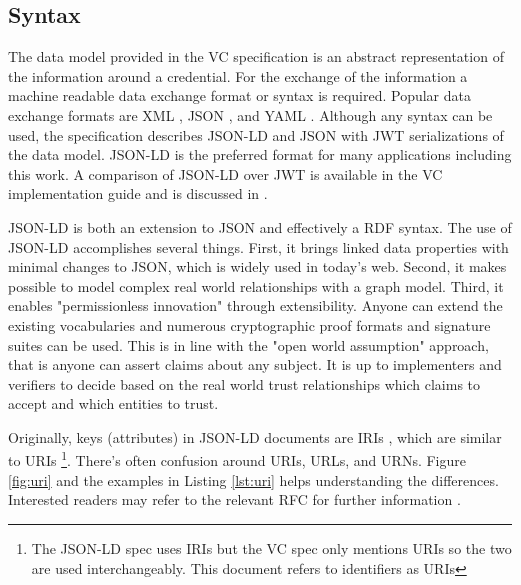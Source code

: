 \subsection{Syntax}

The data model provided in the \acrshort{VC} specification is an abstract representation of the information around a credential. For the exchange of the information a machine readable data exchange format or syntax is required. Popular data exchange formats are XML \parencite{xmlRFC}, \acrshort{JSON} \parencite{jsonRFC}, and \acrshort{YAML} \parencite{yaml}. Although any syntax can be used, the specification describes \acrfull{JSON-LD} \parencite{jsonld} and \acrshort{JSON} with \acrshort{JWT} \parencite{rfc7519} serializations of the data model. \acrshort{JSON-LD} is the preferred format for many applications including this work. A comparison of \acrshort{JSON-LD} over \acrshort{JWT} is available in the \acrshort{VC} implementation guide and is discussed in \cite{young_2021}. 

\acrshort{JSON-LD} is both an extension to \acrshort{JSON} and effectively a \acrfull{RDF} \parencite{rdf} syntax. The use of \acrshort{JSON-LD} accomplishes several things. First, it  brings linked data properties with minimal changes to \acrshort{JSON}, which is widely used in today's web. Second, it makes possible to model complex real world relationships with a graph model. Third, it enables "permissionless innovation" through extensibility. Anyone can extend the existing vocabularies and numerous cryptographic proof formats and signature suites can be used. This is in line with the "open world assumption" approach, that is anyone can assert claims about any subject. It is up to implementers and verifiers to decide based on the real world trust relationships which claims to accept and which entities to trust. 

Originally, keys (attributes) in \acrshort{JSON-LD} documents are \acrfull{IRI}s \parencite{rfc3987}, which are similar to \acrfull{URI}s \parencite{rfc3986}
\footnote{The \acrshort{JSON-LD} spec uses \acrshort{IRI}s but the \acrshort{VC} spec only mentions \acrshort{URI}s so the two are used interchangeably. This document refers to identifiers as \acrshort{URI}s}. 
There's often confusion around \acrshort{URI}s, \acrshort{URL}s, and \acrshort{URN}s. Figure \ref{fig:uri} and the examples in Listing \ref{lst:uri} helps understanding the differences. Interested readers may refer to the relevant \acrshort{RFC} for further information \parencite{rfc3305}.

